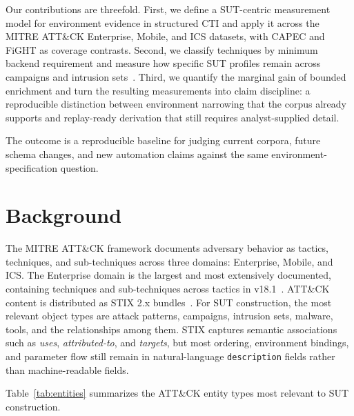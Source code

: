 \documentclass[sigconf]{acmart}
\newcommand{\stix}{STIX\xspace}
\newcommand{\mitre}{MITRE\xspace}
\newcommand{\attack}{ATT\&CK\xspace}
\begin{document}
Our contributions are threefold. First, we define a SUT-centric measurement model for environment evidence in structured CTI and apply it across the \mitre{} \attack{} Enterprise, Mobile, and ICS datasets, with CAPEC and FiGHT as coverage contrasts. Second, we classify techniques by minimum backend requirement and measure how specific SUT profiles remain across campaigns and intrusion sets~\cite{DBLP:conf/uss/SahaMBCVL25}. Third, we quantify the marginal gain of bounded enrichment and turn the resulting measurements into claim discipline: a reproducible distinction between environment narrowing that the corpus already supports and replay-ready derivation that still requires analyst-supplied detail.

The outcome is a reproducible baseline for judging current corpora, future schema changes, and new automation claims against the same environment-specification question.


\section{Background}\label{sec:background}

The \mitre{} \attack{} framework documents adversary behavior as tactics, techniques, and sub-techniques across three domains: Enterprise, Mobile, and ICS. The Enterprise domain is the largest and most extensively documented, containing \enterprisetotalattackpatterncount{} techniques and sub-techniques across \enterprisetacticcount{} tactics in v18.1~\cite{strom2018mitre,DBLP:conf/uss/VirkudIR00024}. ATT\&CK content is distributed as \stix{} 2.x bundles~\cite{stixspec}. For SUT construction, the most relevant object types are attack patterns, campaigns, intrusion sets, malware, tools, and the relationships among them. STIX captures semantic associations such as \emph{uses}, \emph{attributed-to}, and \emph{targets}, but most ordering, environment bindings, and parameter flow still remain in natural-language \texttt{description} fields rather than machine-readable fields.

Table~\ref{tab:entities} summarizes the ATT\&CK entity types most relevant to SUT construction.
\end{document}

